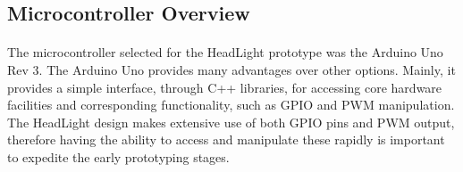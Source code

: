 \documentclass[twoside]{article}
\begin{document}
    \subsection{Microcontroller Overview}
        \paragraph{}
        The microcontroller selected for the HeadLight prototype was the Arduino Uno Rev 3. The Arduino Uno provides many advantages over other options. Mainly, it provides a simple interface, through C++ libraries, for accessing core hardware facilities and corresponding functionality, such as GPIO and PWM manipulation. The HeadLight design makes extensive use of both GPIO pins and PWM output, therefore having the ability to access and manipulate these rapidly is important to expedite the early prototyping stages. 
\end{document}
